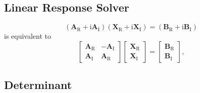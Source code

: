 \documentclass[a4paper,11pt,twoside,openright]{book}
\begin{document}
\subsection{Linear Response Solver}

\begin{equation}
  \left(\mathbf{A}_{\text{R}}+\text{i}\mathbf{A}_{\text{I}}\right)%
    \left(\mathbf{X}_{\text{R}}+\text{i}\mathbf{X}_{\text{I}}\right)%
  =\left(\mathbf{B}_{\text{R}}+\text{i}\mathbf{B}_{\text{I}}\right)
\end{equation}
is equivalent to
\begin{equation}
  \begin{bmatrix}
    \mathbf{A}_{\text{R}} & -\mathbf{A}_{\text{I}}\\
    \mathbf{A}_{\text{I}} & \mathbf{A}_{\text{R}}
  \end{bmatrix}
  \begin{bmatrix}
    \mathbf{X}_{\text{R}}\\
    \mathbf{X}_{\text{I}}
  \end{bmatrix}
  =\begin{bmatrix}
    \mathbf{B}_{\text{R}}\\
    \mathbf{B}_{\text{I}}
  \end{bmatrix},
\end{equation}

\subsection{Determinant}
\end{document}
